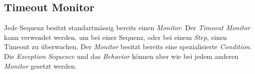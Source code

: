 \subsection{Timeout Monitor}
\label{monitorTimeout}
Jede Sequenz besitzt standartmässig bereits einen \textit{Monitor}.
Der \textit{Timeout Monitor} kann verwendet werden, um bei einer Sequenz, oder bei einem \textit{Step}, einen Timeout zu überwachen.
Der \textit{Monitor} besitzt bereits eine spezialisierte \textit{Condition}.
Die \textit{Exception Sequence} und das \textit{Behavior} können aber wie bei jedem anderen \textit{Monitor} gesetzt werden.





